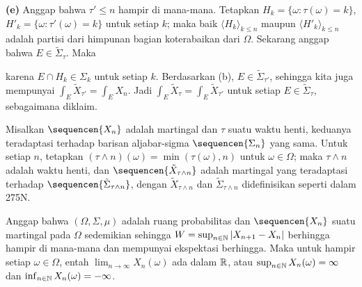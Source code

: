 {\medskip

{\bf (e)} Anggap bahwa $\tau'\le n$ hampir di mana-mana. Tetapkan
$H_k=\{\omega:\tau(\omega)=k\}$,
$H'_k=\{\omega:\tau'(\omega)=k\}$ untuk setiap $k$; maka baik
$\langle H_k\rangle_{k\le n}$ maupun $\langle H'_k\rangle_{k\le n}$ adalah
partisi dari himpunan bagian koterabaikan dari $\Omega$.
Sekarang anggap bahwa $E\in\tilde\Sigma_{\tau}$. Maka


\noindent karena $E\cap H_k\in\Sigma_k$ untuk setiap $k$. Berdasarkan (b),
$E\in\tilde\Sigma_{\tau'}$, sehingga kita juga mempunyai
$\int_E\tilde X_{\tau'}=\int_EX_n$. Jadi
$\int_E\tilde X_{\tau}=\int_E\tilde X_{\tau'}$ untuk setiap
$E\in\tilde\Sigma_{\tau}$, sebagaimana diklaim.
}%

 Misalkan $\sequencen{X_n}$ adalah martingal dan
$\tau$ suatu waktu henti, keduanya teradaptasi terhadap barisan aljabar-sigma
$\sequencen{\Sigma_n}$ yang sama. Untuk setiap $n$, tetapkan
$(\tau\wedge n)(\omega)=\min(\tau(\omega),n)$ untuk $\omega\in\Omega$; maka
$\tau\wedge n$ adalah waktu henti, dan $\sequencen{\tilde X_{\tau\wedge n}}$
adalah martingal yang teradaptasi terhadap
$\sequencen{\tilde\Sigma_{\tau\wedge n}}$, dengan
$\tilde X_{\tau\wedge n}$ dan $\tilde\Sigma_{\tau\wedge n}$ didefinisikan
seperti dalam 275N.


 Anggap bahwa $(\Omega,\Sigma,\mu)$ adalah ruang
probabilitas dan $\sequencen{X_n}$ suatu martingal pada $\Omega$ sedemikian
sehingga $W=\sup_{n\in\Bbb N}|X_{n+1}-X_n|$ berhingga hampir di mana-mana dan
mempunyai ekspektasi berhingga. Maka untuk hampir setiap $\omega\in\Omega$,
entah $\lim_{n\to\infty}X_n(\omega)$ ada dalam $\Bbb R$, atau
$\sup_{n\in\Bbb N}X_n(\omega)=\infty$ dan
$\inf_{n\in\Bbb N}X_n(\omega)=-\infty$.

